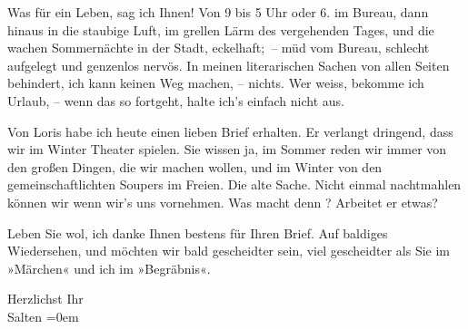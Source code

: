 \pstart
           Was für ein Leben, sag ich Ihnen! Von 9 bis 5 Uhr oder 6. im Bureau, dann hinaus in die staubige Luft,
               im grellen Lärm des vergehenden Tages, und die wachen Sommernächte in der Stadt, eckelhaft; – müd vom Bureau, schlecht aufgelegt und
               genzenlos nervös. In meinen literarischen Sachen von {\pb}allen Seiten behindert,
               ich kann keinen Weg machen, – nichts. Wer weiss, bekomme ich Urlaub, – wenn das so
               fortgeht, halte ich’s einfach nicht aus.\pend
           
\pstart
           Von Loris habe ich heute einen lieben Brief erhalten. Er verlangt dringend, dass wir im
               Winter Theater spielen. Sie wissen ja, im Sommer reden wir immer von den großen
               Dingen, die wir machen wollen, und im Winter von den gemeinschaftlichten Soupers im
               Freien. Die alte Sache. Nicht einmal nachtmahlen können wir wenn wir’s uns
                  vornehmen.\hspace*{2.5em} Was macht denn \label{K_L03123-7v}\label{K_L03123-7}? Arbeitet er etwas?\pend
           
\pstart
           Leben Sie wol, ich danke Ihnen bestens für Ihren Brief. Auf baldiges Wiedersehen, und
               möchten wir bald gescheidter sein, viel gescheidter als Sie im »Märchen« und ich im »Begräbnis«.\pend
           
\pstart
           Herzlichst Ihr{\\[\baselineskip]}\spacefill\mbox{Salten}\pend
           \leftskip=0em{}\endnumbering{}  
      